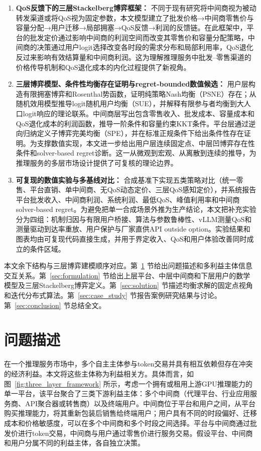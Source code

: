 \documentclass[UTF8,11pt]{ctexart}
\begin{document}
\begin{enumerate}[leftmargin=2em]
  \item \textbf{QoS反馈下的三层Stackelberg博弈框架：} 不同于现有研究将中间商视为被动转发渠道或将QoS视为固定参数，本文模型建立了批发价格→中间商零售价与容量分配→用户迁移→局部拥塞→QoS反馈→利润的反馈链。在此框架中，平台的批发定价通过影响中间商的利润空间而改变其零售价和容量分配策略，中间商的决策通过用户logit选择改变各时段的需求分布和局部利用率，QoS退化反过来影响有效结算量和中间商利润。这为理解推理服务中批发--零售渠道的价格传导机制和QoS退化成本的内化过程提供了新视角。
  \item \textbf{三层博弈模型、条件性均衡存在证明与regret-bounded数值候选：} 用户层构造有限拥塞博弈和Rosenthal势函数，证明纯策略Nash均衡（PSNE）存在；从随机效用模型推导logit随机用户均衡（SUE），并解释有限参与者均衡到大人口logit响应的理论联系。中间商层写出包含零售收入、批发成本、容量成本和QoS退化成本的利润函数，推导一阶条件和容量约束KKT条件。平台层通过逆向归纳定义子博弈完美均衡（SPE），并在标准正规条件下给出条件性存在证明。为支撑数值实现，本文进一步给出用户层连续固定点、中层凹博弈存在性条件和solver-based regret诊断。这一从微观到宏观、从离散到连续的推导，为推理服务的多层市场设计提供了可复核的理论边界。
  \item \textbf{可复现的数值实验与多基线对比：} 合成基准下实现五类策略对比（统一零售、平台直销、单中间商、无QoS动态定价、三层QoS感知定价），并系统报告平台批发收入、中间商利润、系统利润、最低QoS、峰值利用率和中间商solver-based regret。为避免把单一合成场景外推为生产结论，本文把补充实验分为四组：机制归因与有限用户桥接、算法与参数鲁棒性、vLLM测量QoS和测量驱动到达率重放、用户保护与厂家直供API outside option。实验结果和图表均由可复现代码直接生成，并用于界定收入、QoS和用户体验改善同时成立的条件区域。
\end{enumerate}

本文余下结构与三层博弈建模顺序对应。第~\ref{sec:problem} 节给出问题描述和多利益主体信息交互关系。第~\ref{sec:formulation} 节给出上层平台、中层中间商和下层用户的数学模型及三层Stackelberg博弈定义。第~\ref{sec:solution} 节描述均衡求解的固定点视角和迭代分布式算法。第~\ref{sec:case_study} 节报告案例研究结果与讨论。第~\ref{sec:conclusion} 节总结全文。

\section{问题描述}
\label{sec:problem}

在一个推理服务市场中，多个自主主体参与token交易并具有相互依赖但存在冲突的经济利益。本文将这些主体称为利益相关方。具体而言，如图~\ref{fig:three_layer_framework} 所示，考虑一个拥有或租用上游GPU推理能力的单一平台，该平台聚合了三类下游利益主体：多个中间商（代理平台、行业应用服务商、API聚合器或转售商）以及终端用户。中间商位于平台和用户之间，从平台购买推理能力，将其重新包装后销售给终端用户；用户具有不同的时段偏好、迁移成本和价格敏感度，可以在多个中间商和多个时段之间选择。平台与中间商通过批发价进行token交易，中间商与用户通过零售价进行服务交易。假设平台、中间商和用户分属不同的利益主体，各自独立决策。
\end{document}
